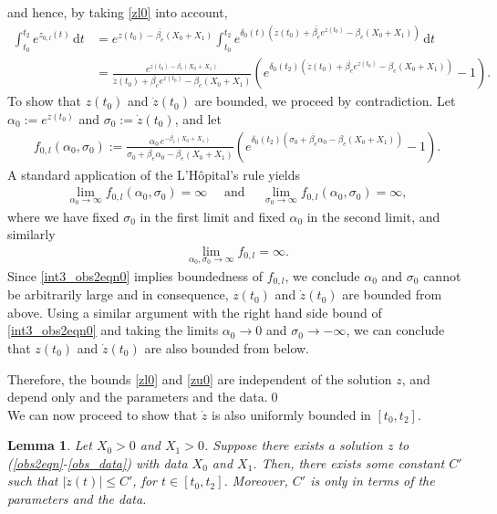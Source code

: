 \documentclass{article}
\newtheorem{lem}[thm]{Lemma}
\newcommand{\dt}{\text{d}t}
\newcommand{\nono}{\nonumber}
\newcommand{\obss}{(\ref{obs2eqn}-\ref{obs_data}) }
\newcommand{\be}{\beta_e}
\newcommand{\bb}{\overline{\be}}
\newcommand{\alp}[1]{\alpha_{#1}}
\newcommand{\sig}[1]{\sigma_{#1}}
\begin{document}
%
and hence, by taking \eqref{zl0} into account,
%
\begin{align*}
    \int_{t_{0}}^{t_{2}} e^{z_{0,l}(t)} \, \dt &= e^{z(t_{0}) - \bb (X_0+X_1)} \int_{t_{0}}^{t_{2}} e^{\delta_{0}(t) \left( \dot{z}(t_{0}) + \bb e^{z(t_{0})} - \be (X_0+X_1) \right)} \, \dt  \nono \\
        &= \frac{e^{z(t_{0}) - \bb (X_0+X_1)}}{\dot{z}(t_{0}) + \bb e^{z(t_{0})} - \be (X_0+X_1)} \left( e^{\delta_0(t_2) \left( \dot{z}(t_{0}) + \bb e^{z(t_{0})} - \be (X_0+X_1) \right)} - 1 \right). %
\end{align*}
%
To show that $z(t_0)$ and $\dot{z}(t_0)$ are bounded, we proceed by contradiction. Let $\alp{0} := e^{z(t_{0})}$ and $\sig{0} := \dot{z}(t_{0})$, and let
%
\begin{align*}
    f_{0,l}(\alp{0},\sig{0}) := \frac{\alp{0} \, e^{-\bb(X_0+X_1)}}{\sig{0} + \bb \alp{0} - \be(X_0+X_1)} \left(e^{\delta_0(t_2) \left(\sig{0} + \bb \alp{0} - \be(X_0 + X_1) \right)} - 1 \right). %
\end{align*}
%
A standard application of the L'H\^{o}pital's rule yields
%
\begin{align*}
    \lim_{\alp{0} \rightarrow \infty} f_{0,l}(\alp{0},\sig{0}) = \infty \quad \text{ and } \quad \lim_{\sig{0} \rightarrow \infty} f_{0,l}(\alp{0},\sig{0}) = \infty, %
\end{align*}
%
where we have fixed $\sig{0}$ in the first limit and fixed $\alp{0}$ in the second limit, and similarly
%
\begin{align*}
    \lim_{\alpha_0,\sigma_0 \rightarrow \infty} f_{0,l} = \infty. %
\end{align*}
%
Since \eqref{int3_obs2eqn0} implies boundedness of $f_{0,l}$, we conclude $\alpha_0$ and $\sigma_0$ cannot be arbitrarily large and in consequence, $z(t_0)$ and $\dot{z}(t_0)$ are bounded from above. Using a similar argument with the right hand side bound of \eqref{int3_obs2eqn0} and taking the limits $\alpha_0 \rightarrow 0$ and $\sigma_0 \rightarrow -\infty$, we can conclude that $z(t_0)$ and $\dot{z}(t_0)$ are also bounded from below.

Therefore, the bounds \eqref{zl0} and \eqref{zu0} are independent of the solution $z$, and depend only and the parameters and the data.\qed \\

We can now proceed to show that $\dot{z}$ is also uniformly bounded in $[t_0,t_2]$.

\begin{lem} \label{z'bound}
Let $X_0>0$ and $X_1>0$. Suppose there exists a solution $z$ to \obss with data $X_0$ and $X_1$. Then, there exists some constant $C'$ such that $|\dot{z}(t)| \leq C'$, for $t \in [t_{0},t_{2}]$. Moreover, $C'$ is only in terms of the parameters and the data. 
\end{lem}
\end{document}
